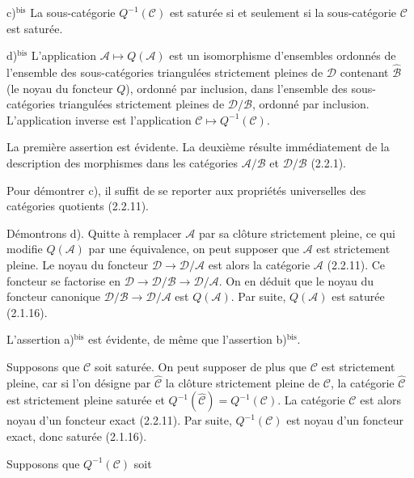 \par\noindent c)$^{\mathrm{bis}}$ La sous-catégorie $Q^{-1}(\mathcal C)$ est
saturée si et seulement si la sous-catégorie $\mathcal C$ est saturée.

\par\noindent d)$^{\mathrm{bis}}$ L'application
$\mathcal A\longmapsto Q(\mathcal A)$ est un isomorphisme d'ensembles
ordonnés de l'ensemble des sous-catégories triangulées strictement pleines
de $\mathcal D$ contenant $\widehat{\mathcal B}$ (le noyau du foncteur
$Q$), ordonné par inclusion, dans l'ensemble des sous-catégories
triangulées strictement pleines de $\mathcal D/\mathcal B$, ordonné par
inclusion. L'application inverse est l'application
$\mathcal C\longmapsto Q^{-1}(\mathcal C)$.
\endgroup

La première assertion est évidente. La deuxième résulte immédiatement de
la description des morphismes dans les catégories
$\mathcal A/\mathcal B$ et $\mathcal D/\mathcal B$ (2.2.1).

Pour démontrer c), il suffit de se reporter aux propriétés universelles des
catégories quotients (2.2.11).

Démontrons d). Quitte à remplacer $\mathcal A$ par sa clôture strictement
pleine, ce qui modifie $Q(\mathcal A)$ par une équivalence, on peut supposer
que $\mathcal A$ est strictement pleine. Le noyau du foncteur
$\mathcal D\longrightarrow\mathcal D/\mathcal A$ est alors la catégorie
$\mathcal A$ (2.2.11). Ce foncteur se factorise en
$\mathcal D\longrightarrow\mathcal D/\mathcal B
\longrightarrow\mathcal D/\mathcal A$. On en déduit que le noyau du
foncteur canonique
$\mathcal D/\mathcal B\longrightarrow\mathcal D/\mathcal A$ est
$Q(\mathcal A)$. Par suite, $Q(\mathcal A)$ est saturée (2.1.16).

L'assertion a)$^{\mathrm{bis}}$ est évidente, de même que l'assertion
b)$^{\mathrm{bis}}$.

Supposons que $\mathcal C$ soit saturée. On peut supposer de plus que
$\mathcal C$ est strictement pleine, car si l'on désigne par
$\widehat{\mathcal C}$ la clôture strictement pleine de $\mathcal C$, la
catégorie $\widehat{\mathcal C}$ est strictement pleine saturée et
$Q^{-1}(\widehat{\mathcal C})=Q^{-1}(\mathcal C)$. La catégorie
$\mathcal C$ est alors noyau d'un foncteur exact (2.2.11). Par suite,
$Q^{-1}(\mathcal C)$ est noyau d'un foncteur exact, donc saturée (2.1.16).

Supposons que $Q^{-1}(\mathcal C)$ soit
\endgroup
